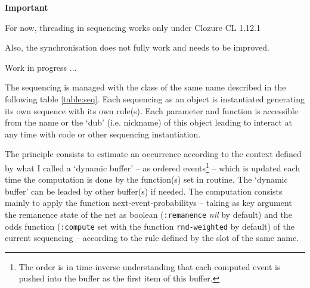  \begin{notes}

{\large \textbf{Important}}

For now, threading in sequencing works only under Clozure CL 1.12.1

Also, the synchronisation does not fully work and needs to be improved.

Work in progress ...

\end{notes}

\bigskip

The sequencing is managed with the class of the same name described in the following table \ref{table:seq}. Each sequencing as an object is instantiated generating its own sequence with its own rule(s). Each parameter and function is accessible from the name or the `dub' (i.e. nickname) of this object leading to interact at any time with code or other sequencing instantiation.

\smallskip

The principle consists to estimate an occurrence according to the context defined by what I called a `dynamic buffer' -- as ordered events\footnote{The order is in time-inverse understanding that each computed event is pushed into the buffer as the first item of this buffer.} -- which is updated each time the computation is done by the function(s) set in routine. The `dynamic buffer' can be leaded by other buffer(s) if needed. The computation consists mainly to apply the function \glspl{next-event-probability} -- taking as key argument the remanence state of the net as boolean (\texttt{:remanence} \textit{nil} by default)  and the odds function (\texttt{:compute} set with the function \texttt{rnd-weighted} by default) of the current sequencing --  according to the rule defined by the slot of the same name. 

\bigskip 

